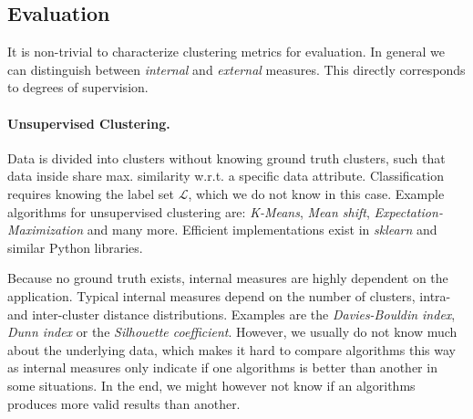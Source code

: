 \subsection{Evaluation}
\label{subsec:eval}
It is non-trivial to characterize clustering metrics for evaluation. In general we can distinguish between \textit{internal} and \textit{external} measures. This directly corresponds to degrees of supervision. 

\paragraph{Unsupervised Clustering.}
Data is divided into clusters without knowing ground truth clusters, such that data inside share max. similarity w.r.t. a specific data attribute. Classification requires knowing the label set $ \mathcal{L} $, which we do not know in this case. Example algorithms for unsupervised clustering are: \textit{K-Means}, \textit{Mean shift}, \textit{Expectation-Maximization} and many more. Efficient implementations exist in \textit{sklearn} and similar Python libraries. %

Because no ground truth exists, internal measures are highly dependent on the application. Typical internal measures depend on the number of clusters, intra- and inter-cluster distance distributions. Examples are the \textit{Davies-Bouldin index}, \textit{Dunn index} or the \textit{Silhouette coefficient}. However, we usually do not know much about the underlying data, which makes it hard to compare algorithms this way as internal measures only indicate if one algorithms is better than another in some situations. In the end, we might however not know if an algorithms produces more valid results than another. %

